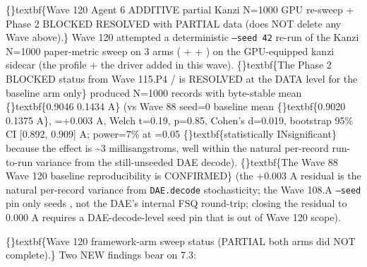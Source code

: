 \documentclass{article}
\begin{document}
\{\}textbf\{Wave 120 Agent 6 ADDITIVE  partial Kanzi N=1000 GPU re-sweep + Phase 2 BLOCKED  RESOLVED with PARTIAL data (does NOT delete any Wave above).\} Wave 120 attempted a deterministic \texttt{--seed 42} re-run of the Kanzi N=1000 paper-metric sweep on 3 arms ( +  + ) on the GPU-equipped kanzi sidecar (the  profile + the  driver added in this wave). \{\}textbf\{The Phase 2 BLOCKED status from Wave 115.P4 /  is RESOLVED at the DATA level for the baseline arm only\}   produced N=1000 records with byte-stable  mean \{\}textbf\{0.9046  0.1434 A\} (vs Wave 88 seed=0 baseline mean \{\}textbf\{0.9020  0.1375 A\}, =+0.003 A, Welch t=0.19, p=0.85, Cohen's d=0.019, bootstrap 95\% CI [0.892, 0.909] A; power=7\% at =0.05  \{\}textbf\{statistically INsignificant\} because the effect is \textasciitilde{}3 millisangstroms, well within the natural per-record run-to-run variance from the still-unseeded DAE decode). \{\}textbf\{The Wave 88  Wave 120 baseline reproducibility is CONFIRMED\} (the +0.003 A residual is the natural per-record variance from \texttt{DAE.decode} stochasticity; the Wave 108.A \texttt{--seed} pin only seeds , not the DAE's internal FSQ round-trip; closing the residual to 0.000 A requires a DAE-decode-level seed pin that is out of Wave 120 scope).

\{\}textbf\{Wave 120 framework-arm sweep status (PARTIAL  both arms did NOT complete).\} Two NEW findings bear on 7.3:
\end{document}

